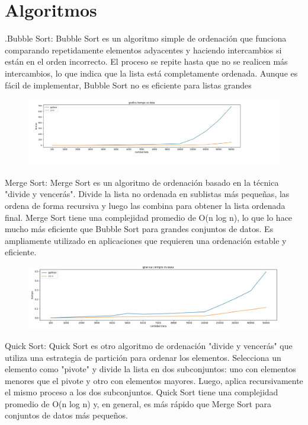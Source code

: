 \section{Algoritmos}
.Bubble Sort:
Bubble Sort es un algoritmo simple de ordenación que funciona comparando repetidamente elementos adyacentes y haciendo intercambios si están en el orden incorrecto. El proceso se repite hasta que no se realicen más intercambios, lo que indica que la lista está completamente ordenada. Aunque es fácil de implementar, Bubble Sort no es eficiente para listas grandes

\begin{figure}[h]
    \centering
    \includegraphics[scale=0.4]{images/1.JPG}
    \label{fig:imagen}
\end{figure}

Merge Sort:
Merge Sort es un algoritmo de ordenación basado en la técnica "divide y vencerás". Divide la lista no ordenada en sublistas más pequeñas, las ordena de forma recursiva y luego las combina para obtener la lista ordenada final. Merge Sort tiene una complejidad promedio de O(n log n), lo que lo hace mucho más eficiente que Bubble Sort para grandes conjuntos de datos. Es ampliamente utilizado en aplicaciones que requieren una ordenación estable y eficiente.
\begin{figure}[h]
    \centering
    \includegraphics[scale=0.3]{images/2.JPG}
    \label{fig:imagen}
\end{figure}

Quick Sort:
Quick Sort es otro algoritmo de ordenación "divide y vencerás" que utiliza una estrategia de partición para ordenar los elementos. Selecciona un elemento como "pivote" y divide la lista en dos subconjuntos: uno con elementos menores que el pivote y otro con elementos mayores. Luego, aplica recursivamente el mismo proceso a los dos subconjuntos. Quick Sort tiene una complejidad promedio de O(n log n) y, en general, es más rápido que Merge Sort para conjuntos de datos más pequeños.

